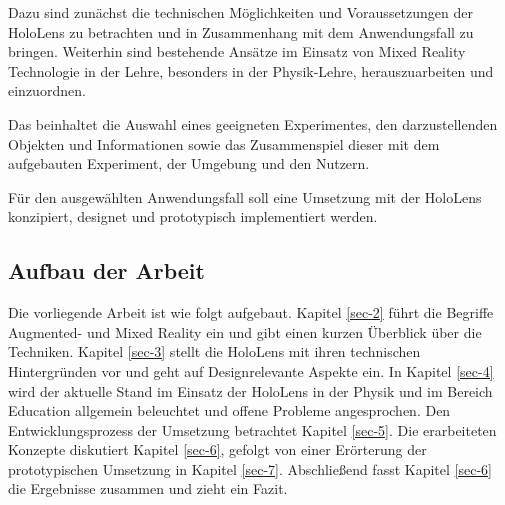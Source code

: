 \par
Dazu sind zunächst die technischen Möglichkeiten und Voraussetzungen der HoloLens zu betrachten und in Zusammenhang mit dem Anwendungsfall zu bringen. Weiterhin sind bestehende Ansätze im Einsatz von Mixed Reality Technologie in der Lehre, besonders in der Physik-Lehre, herauszuarbeiten und einzuordnen.

Das beinhaltet die Auswahl eines geeigneten Experimentes, den darzustellenden Objekten und Informationen sowie das Zusammenspiel dieser mit dem aufgebauten Experiment, der Umgebung und den Nutzern.\\

\par
Für den ausgewählten Anwendungsfall soll eine Umsetzung mit der HoloLens konzipiert, designet und prototypisch implementiert werden.

\subsection{Aufbau der Arbeit}
\label{sec-1-3}
Die vorliegende Arbeit ist wie folgt aufgebaut. Kapitel \ref{sec-2} führt die Begriffe Augmented- und Mixed Reality ein und gibt einen kurzen Überblick über die Techniken. Kapitel \ref{sec-3} stellt die HoloLens mit ihren technischen Hintergründen vor und geht auf Designrelevante Aspekte ein. In Kapitel \ref{sec-4} wird der aktuelle Stand im Einsatz der HoloLens in der Physik und im Bereich Education allgemein beleuchtet und offene Probleme angesprochen. Den Entwicklungsprozess der Umsetzung betrachtet Kapitel \ref{sec-5}. Die erarbeiteten Konzepte diskutiert Kapitel \ref{sec-6}, gefolgt von einer Erörterung der prototypischen Umsetzung in Kapitel \ref{sec-7}. Abschließend fasst Kapitel \ref{sec-6} die Ergebnisse zusammen und zieht ein Fazit.